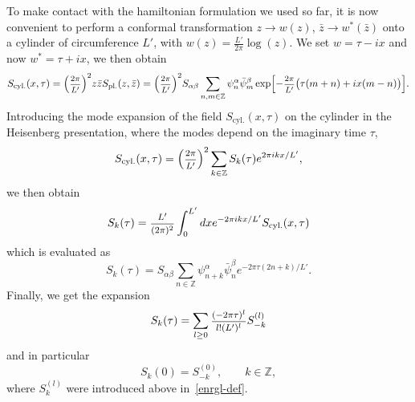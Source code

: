 \documentclass[11pt]{article}
\newcommand{\ffrac}[2]{\mbox{\footnotesize$\displaystyle\frac{#1}{#2}$}}
\newcommand{\oZ}{\mathbb{Z}}
\newcommand{\bz}{\bar{z}}
\newcommand{\enrg}{S}
\newcommand{\enrgpl}{\enrg_{\text{pl.}}}
\newcommand{\enrgcyl}{\enrg_{\text{cyl.}}}
\newcommand{\LL}{L'}
\theoremstyle{definition}
\begin{document}
To make contact with the hamiltonian formulation we used so far, it is now convenient to perform a conformal transformation $z\to w(z)$, $\bz\to w^*(\bz)$
onto a cylinder of   circumference $\LL$, with  $w(z)=\frac{\LL}{2\pi}\log(z)$.
We set
$w=\tau -i x$ and now $w^*=\tau +i x$, we then obtain
\begin{equation}
\enrgcyl(x,\tau) = \Bigl(\ffrac{2\pi}{\LL}\Bigr)^2z\bz\enrgpl(z,\bz)
=\Bigl(\ffrac{2\pi}{\LL}\Bigr)^2  S_{\alpha\beta}
\sum_{n,m\in\oZ}\psi^{\alpha}_n \bar{\psi}^{\beta}_m  \exp\Bigl[-\ffrac{2\pi}{\LL}\bigl(\tau(m+n)+ix(m-n)\bigr)\Bigr].
\end{equation}
Introducing the mode expansion of the field $\enrgcyl(x,\tau)$ on the
cylinder in the Heisenberg presentation, where the modes depend on the
imaginary time $\tau$,
\begin{equation}\label{enrg-modes-exp}
\enrgcyl(x,\tau) = \Bigl(\ffrac{2\pi}{\LL}\Bigr)^2
\sum_{k\in\oZ}\enrg_k(\tau)e^{2\pi ik x/\LL},
\end{equation}
we then obtain
\begin{equation}
\enrg_k(\tau) = \ffrac{\LL}{(2\pi)^2}\int_{0}^{\LL}dx e^{-2\pi i
  k x/\LL} \enrgcyl(x,\tau)
\end{equation}
which is evaluated as
\begin{equation}
\enrg_k(\tau) = S_{\alpha\beta} \sum_{n\in\oZ}\psi^{\alpha}_{n+k}
\bar{\psi}^{\beta}_n e^{-2\pi \tau(2n+k)/\LL}.
\end{equation}
Finally, we get the expansion
\begin{equation}\label{enrg-modes}
\enrg_k(\tau) = \sum_{l\geq0} \ffrac{(-2\pi \tau)^l}{l!(\LL)^l} \enrg^{(l)}_{-k}
\end{equation}
and in particular
\begin{equation}
 \enrg_{k}(0) = \enrg^{(0)}_{-k} ,\qquad k\in\oZ,
\end{equation}
where $\enrg^{(l)}_{k}$ were introduced above in~\eqref{enrgl-def}.
\end{document}
